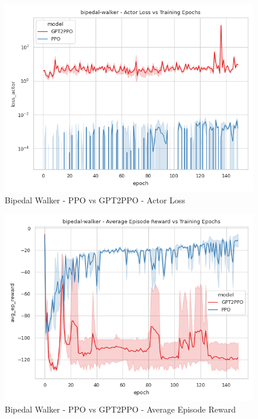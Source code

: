 \begin{figure}[htbp]
    \centerline{\includegraphics[width=\columnwidth]{./img/bipedal-walker-loss_actor-model.png}}
    \caption{Bipedal Walker - PPO vs GPT2PPO - Actor Loss}
    \label{bipedal-walker-loss_actor-model}
\end{figure}

\begin{figure}[htbp]
    \centerline{\includegraphics[width=\columnwidth]{./img/bipedal-walker-avg_ep_reward-model.png}}
    \caption{Bipedal Walker - PPO vs GPT2PPO - Average Episode Reward}
    \label{bipedal-walker-avg_ep_reward-model}
\end{figure}


